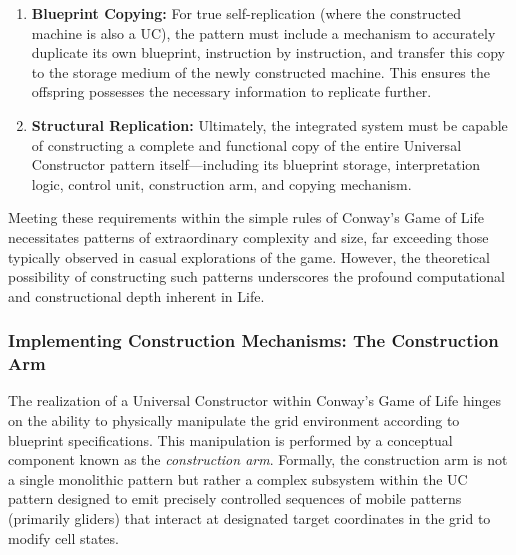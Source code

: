 \documentclass{article}
\theoremstyle{definition}
\theoremstyle{plain}
\theoremstyle{plain}
\begin{document}
\begin{enumerate}
  \item \textbf{Blueprint Copying:} For true self-replication (where the constructed machine is also a UC), the pattern must include a mechanism to accurately duplicate its own blueprint, instruction by instruction, and transfer this copy to the storage medium of the newly constructed machine. This ensures the offspring possesses the necessary information to replicate further.

  \item \textbf{Structural Replication:} Ultimately, the integrated system must be capable of constructing a complete and functional copy of the entire Universal Constructor pattern itself—including its blueprint storage, interpretation logic, control unit, construction arm, and copying mechanism.
\end{enumerate}

Meeting these requirements within the simple rules of Conway's Game of Life necessitates patterns of extraordinary complexity and size, far exceeding those typically observed in casual explorations of the game. However, the theoretical possibility of constructing such patterns underscores the profound computational and constructional depth inherent in Life.

\subsubsection{Implementing Construction Mechanisms: The Construction Arm}
The realization of a Universal Constructor within Conway's Game of Life hinges on the ability to physically manipulate the grid environment according to blueprint specifications. This manipulation is performed by a conceptual component known as the \textit{construction arm}. Formally, the construction arm is not a single monolithic pattern but rather a complex subsystem within the UC pattern designed to emit precisely controlled sequences of mobile patterns (primarily gliders) that interact at designated target coordinates in the grid to modify cell states.
\end{document}
